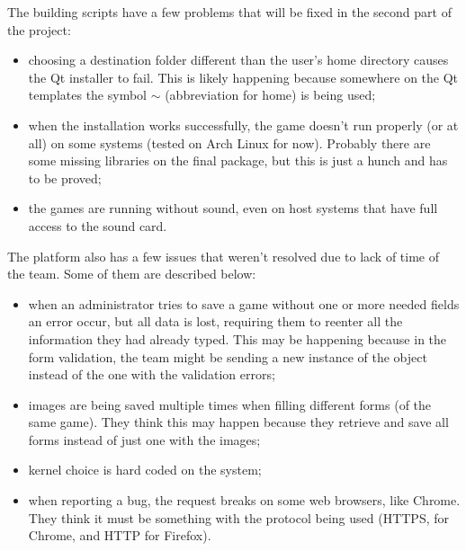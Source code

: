 The building scripts have a few problems that will be fixed in the second part of the project:

\begin{itemize}
\item choosing a destination folder different than the user's home directory causes the Qt installer to fail. This is likely happening because somewhere on the Qt templates the symbol $\sim$ (abbreviation for home) is being used;

\item when the installation works successfully, the game doesn't run properly (or at all) on some systems (tested on Arch Linux for now). Probably there are some missing libraries on the final package, but this is just a hunch and has to be proved;

\item the games are running without sound, even on host systems that have full access to the sound card.
\end{itemize}

The platform also has a few issues that weren't resolved due to lack of time of the team. Some of them are described below:

\begin{itemize}
\item when an administrator tries to save a game without one or more needed fields an error occur, but all data is lost, requiring them to reenter all the information they had already typed. This may be happening because in the form validation, the team might be sending a new instance of the object instead of the one with the validation errors;

\item images are being saved multiple times when filling different forms (of the same game). They think this may happen because they retrieve and save all forms instead of just one with the images;

\item kernel choice is hard coded on the system;

\item when reporting a bug, the request breaks on some web browsers, like Chrome. They think it must be something with the protocol being used (HTTPS, for Chrome, and HTTP for Firefox).
\end{itemize}
